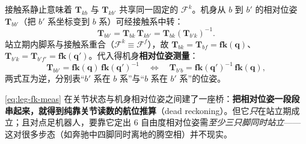 \begin{derivation}[由正运动学得相对位姿]
接触系静止意味着 $\mathbf{T}_{kb}$ 与 $\mathbf{T}_{kb'}$ 共享同一固定的 $\mathcal{F}^k$。机身从 $b$ 到 $b'$ 的相对位姿 $\mathbf{T}_{bb'}$（把 $b'$ 系坐标变到 $b$ 系）可经接触系中转：
\[
  \mathbf{T}_{bb'}=\mathbf{T}_{bk}\,\mathbf{T}_{kb'}=\mathbf{T}_{bk}(\mathbf{T}_{b'k})^{-1}.
\]
站立期内脚系与接触系重合（$\mathcal{F}^k\equiv\mathcal{F}^f$），故 $\mathbf{T}_{bk}=\mathbf{T}_{bf}=\mathbf{fk}(\mathbf{q})$、$\mathbf{T}_{b'k}=\mathbf{T}_{b'f'}=\mathbf{fk}(\mathbf{q}')$。代入得机身\textbf{相对位姿测量}：
\begin{equation}
  \mathbf{T}_{bb'}=\mathbf{fk}(\mathbf{q})\,\mathbf{fk}(\mathbf{q}')^{-1}
  \quad\Longleftrightarrow\quad
  \mathbf{T}_{b'b}=\mathbf{fk}(\mathbf{q}')^{-1}\,\mathbf{fk}(\mathbf{q}),
  \label{eq:leg-fk-meas}
\end{equation}
两式互为逆，分别表“$b'$ 系在 $b$ 系”与“$b$ 系在 $b'$ 系”的位姿。
\end{derivation}

\cref{eq:leg-fk-meas} 在关节状态与机身相对位姿之间建了一座桥：\textbf{把相对位姿一段段串起来，就得到纯靠关节读数的航位推算}（dead reckoning）。但它\emph{只}在站立期成立；且对点足机器人，要靠它定出 $6$ 自由度相对位姿需\emph{至少三只脚同时站立}——这对很多步态（如奔驰中四脚同时离地的腾空相）并不现实。

